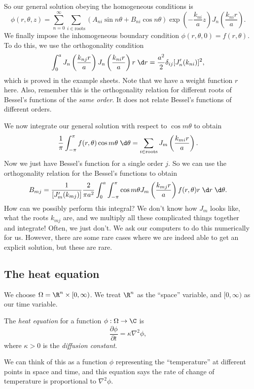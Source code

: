 \documentclass[a4paper]{article}
\begin{document}
So our general solution obeying the homogeneous conditions is
\[
  \phi(r, \theta, z) = \sum_{n = 0}^\infty \sum_{i \in \text{roots}} (A_{ni} \sin n \theta + B_{ni}\cos n\theta) \exp\left(-\frac{k_{ni}}{a}z\right) J_n \left(\frac{k_{ni}r}{a}\right).
\]
We finally impose the inhomogeneous boundary condition $\phi(r, \theta, 0) = f(r, \theta)$. To do this, we use the orthogonality condition
\[
  \int_0^a J_n\left(\frac{k_{nj}r}{a}\right)J_n\left(\frac{k_{ni}r}{a}\right) r\;\d r = \frac{a^2}{2}\delta_{ij}[J_n'(k_{ni})]^2,
\]
which is proved in the example sheets. Note that we have a weight function $r$ here. Also, remember this is the orthogonality relation for different roots of Bessel's functions of the \emph{same order}. It does not relate Bessel's functions of different orders.

We now integrate our general solution with respect to $\cos m\theta$ to obtain
\[
  \frac{1}{\pi}\int_{-\pi}^\pi f(r, \theta) \cos m\theta \;\d \theta = \sum_{i \in \text{roots}} J_m\left(\frac{k_{mi}r}{a}\right).
\]
Now we just have Bessel's function for a single order $j$. So we can use the orthogonality relation for the Bessel's functions to obtain
\[
  B_{mj} = \frac{1}{[J'_m(k_{mj})]}\frac{2}{\pi a^2}\int_0^a \int_{-\pi}^\pi \cos m\theta J_m\left(\frac{k_{mj}r}{a}\right) f(r, \theta)r \;\d r \;\d \theta.
\]
How can we possibly perform this integral? We don't know how $J_m$ looks like, what the roots $k_{mj}$ are, and we multiply all these complicated things together and integrate! Often, we just don't. We ask our computers to do this numerically for us. However, there are some rare cases where we are indeed able to get an explicit solution, but these are rare.

\subsection{The heat equation}
We choose $\Omega = \R^n \times[0, \infty)$. We treat $\R^n$ as the ``space'' variable, and $[0, \infty)$ as our time variable.
\begin{defi}
  The \emph{heat equation} for a function $\phi: \Omega \to \C$ is
  \[
    \frac{\partial \phi}{\partial t} = \kappa \nabla^2 \phi,
  \]
  where $\kappa > 0$ is the \emph{diffusion constant}.
\end{defi}
We can think of this as a function $\phi$ representing the ``temperature'' at different points in space and time, and this equation says the rate of change of temperature is proportional to $\nabla^2 \phi$.
\end{document}

